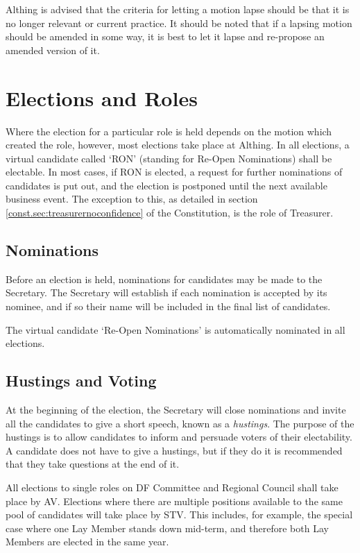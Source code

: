 \documentclass[a4paper, 11pt]{article} %
\begin{document}
Althing is advised that the criteria for letting a motion lapse should be that it is no longer relevant or current practice.  It should be noted that if a lapsing motion should be amended in some way, it is best to let it lapse and re-propose an amended version of it.

\section{Elections and Roles}
Where the election for a particular role is held depends on the motion which created the role, however, most elections take place at Althing.  In all elections, a virtual candidate called `RON' (standing for Re-Open Nominations) shall be electable.  In most cases, if RON is elected, a request for further nominations of candidates is put out, and the election is postponed until the next available business event.  The exception to this, as detailed in section \ref{const.sec:treasurernoconfidence} of the Constitution, is the role of Treasurer.

\subsection{Nominations}
Before an election is held, nominations for candidates may be made to the Secretary.  The Secretary will establish if each nomination is accepted by its nominee, and if so their name will be included in the final list of candidates.

The virtual candidate `Re-Open Nominations' is automatically nominated in all elections.

\subsection{Hustings and Voting}
At the beginning of the election, the Secretary will close nominations and invite all the candidates to give a short speech, known as a \emph{hustings}.  The purpose of the hustings is to allow candidates to inform and persuade voters of their electability.  A candidate does not have to give a hustings, but if they do it is recommended that they take questions at the end of it.

All elections to single roles on DF Committee and Regional Council shall take place by AV.  Elections where there are multiple positions available to the same pool of candidates will take place by STV.  This includes, for example, the special case where one Lay Member stands down mid-term, and therefore both Lay Members are elected in the same year.
\end{document}
